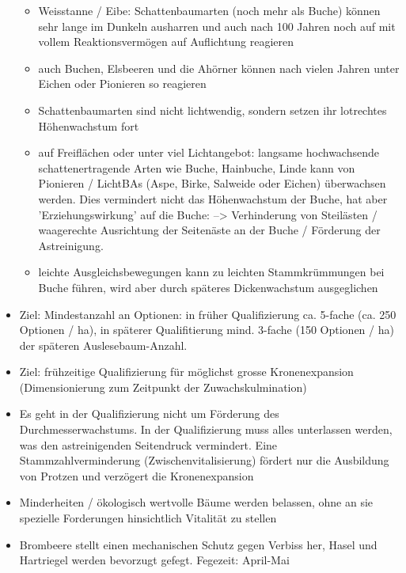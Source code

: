 \documentclass{article}
\begin{document}
\begin{itemize}
\begin{itemize}
	 \item  Weisstanne / Eibe: Schattenbaumarten (noch mehr als Buche) können sehr lange im Dunkeln ausharren und auch nach 100 Jahren noch auf mit vollem Reaktionsvermögen auf Auflichtung reagieren
	 
	 \item auch Buchen, Elsbeeren und die Ahörner können nach vielen Jahren unter Eichen oder Pionieren so reagieren
	 
	 \item Schattenbaumarten sind nicht lichtwendig, sondern setzen ihr lotrechtes Höhenwachstum fort
	 
	 \item auf Freiflächen oder unter viel Lichtangebot: langsame hochwachsende schattenertragende Arten wie Buche, Hainbuche, Linde kann von Pionieren / LichtBAs (Aspe, Birke, Salweide oder Eichen) überwachsen werden. Dies vermindert nicht das Höhenwachstum der Buche, hat aber 'Erziehungswirkung' auf die Buche: -->  Verhinderung von Steilästen / waagerechte Ausrichtung der Seitenäste an der Buche / Förderung der Astreinigung.
	 
	 \item leichte Ausgleichsbewegungen kann zu leichten Stammkrümmungen bei Buche führen, wird aber durch späteres Dickenwachstum ausgeglichen
	 
	\end{itemize}
	 
 \item Ziel: Mindestanzahl an Optionen: in früher Qualifizierung ca. 5-fache (ca. 250 Optionen / ha), in späterer Qualifitierung mind. 3-fache (150 Optionen / ha) der späteren Auslesebaum-Anzahl.
 
 \item Ziel: frühzeitige Qualifizierung für möglichst grosse Kronenexpansion (Dimensionierung zum Zeitpunkt der Zuwachskulmination)
 
  \item Es geht in der Qualifizierung nicht um Förderung des Durchmesserwachstums. In der Qualifizierung muss alles unterlassen werden, was den astreinigenden Seitendruck vermindert. Eine Stammzahlverminderung (Zwischenvitalisierung) fördert nur die Ausbildung von Protzen und verzögert die Kronenexpansion

 \item Minderheiten / ökologisch wertvolle Bäume werden belassen, ohne an sie spezielle Forderungen hinsichtlich Vitalität zu stellen

 \item Brombeere stellt einen mechanischen Schutz gegen Verbiss her, Hasel und Hartriegel werden bevorzugt gefegt. Fegezeit: April-Mai
 

\end{itemize}
\end{document}
